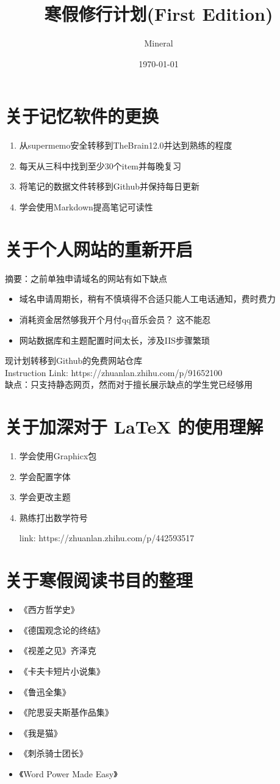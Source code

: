\documentclass[utf8]{ctexart}
\author{Mineral}
\title{寒假修行计划(First Edition)}
\date {\today}
\begin{document}
		\maketitle
		\section{关于记忆软件的更换}
		\begin{enumerate}
				\item 从supermemo安全转移到TheBrain12.0并达到熟练的程度
				\item 每天从三科中找到至少30个item并每晚复习
				\item 将笔记的数据文件转移到Github并保持每日更新
				\item 学会使用Markdown提高笔记可读性			
		\end{enumerate}
		\section{关于个人网站的重新开启}
		摘要：之前单独申请域名的网站有如下缺点
		\begin{itemize}
				\item 域名申请周期长，稍有不慎填得不合适只能人工电话通知，费时费力
				\item 消耗资金居然够我开个月付qq音乐会员？ 这不能忍
				\item 网站数据库和主题配置时间太长，涉及IIS步骤繁琐	
		\end{itemize}
		\large{现计划转移到Github的免费网站仓库}\\
		Instruction Link: https://zhuanlan.zhihu.com/p/91652100 \\
		缺点：只支持静态网页，然而对于擅长展示缺点的学生党已经够用
		\section{关于加深对于 \LaTeX{} 的使用理解}
		\begin{enumerate}
				\item 学会使用Graphicx包
				\item 学会配置字体
				\item 学会更改主题
				\item 熟练打出数学符号
				\par link: https://zhuanlan.zhihu.com/p/442593517			
		\end{enumerate}
		\section{关于寒假阅读书目的整理}
		\begin{itemize}
				\item 《西方哲学史》
				\item 《德国观念论的终结》
				\item 《视差之见》齐泽克 
				\item 《卡夫卡短片小说集》
				\item 《鲁迅全集》
				\item 《陀思妥夫斯基作品集》
				\item 《我是猫》
				\item 《刺杀骑士团长》					
				\item 《Word Power Made Easy》
		\end{itemize}
\end{document}
